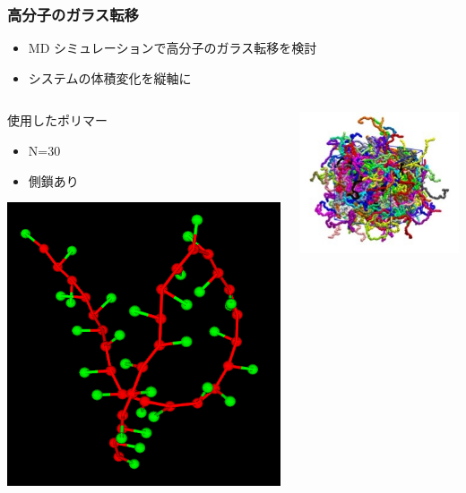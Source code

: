 \documentclass[12pt, dvipdfmx]{beamer}
\begin{document}
\begin{frame}
	\frametitle{高分子のガラス転移}
	\begin{itemize}
		\item MD シミュレーションで高分子のガラス転移を検討
		\item システムの体積変化を縦軸に
	\end{itemize}
	
	\vspace{-3mm}
	\begin{columns}[t, onlytextwidth]
			\begin{block}{使用したポリマー}
				\begin{itemize}
					\item N=30
					\item 側鎖あり
				\end{itemize}
				\centering
				\includegraphics[width=.7\textwidth]{N30_wSC1_single.png}
			\end{block}
		\begin{center}
			\centering
			\includegraphics[width=.4\textwidth]{polymer_image2.png}


\end{center}
\end{columns}
\end{frame}
\end{document}
